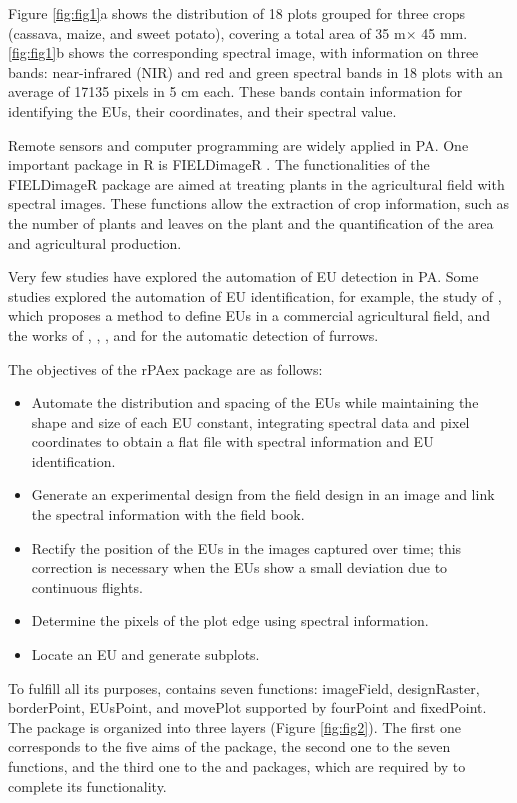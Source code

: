 Figure \ref{fig:fig1}a shows the distribution of 18 plots grouped for three crops (cassava, maize, and sweet potato), covering a total area of 35 m× 45 mm. \ref{fig:fig1}b shows the corresponding spectral image, with information on three bands: near-infrared (NIR) and red and green spectral bands in 18 plots with an average of 17135 pixels in 5 cm each. These bands contain information for identifying the EUs, their coordinates, and their spectral value.

Remote sensors and computer programming are widely applied in PA. One important package in R is FIELDimageR \citep{matias2020fieldimager}. The functionalities of the FIELDimageR package are aimed at treating plants in the agricultural field with spectral images. These functions allow the extraction of crop information, such as the number of plants and leaves on the plant and the quantification of the area and agricultural production.

Very few studies have explored the automation of EU detection in PA. Some studies explored the automation of EU identification, for example, the study of \citet{willers2008defining}, which proposes a method to define EUs in a commercial agricultural field, and the works of \citet{montalvo2012automatic}, \citet{guerrero2013automatic}, \citet{perez2015semi}, \citet{basso2020uav} and \citet{zhang2018automated} for the automatic detection of furrows.

The objectives of the rPAex package are as follows:

\begin{itemize}
\tightlist
\item
  Automate the distribution and spacing of the EUs while maintaining the shape and size of each EU constant, integrating spectral data and pixel coordinates to obtain a flat file with spectral information and EU identification.
\item
  Generate an experimental design from the field design in an image and link the spectral information with the field book.
\item
  Rectify the position of the EUs in the images captured over time; this correction is necessary when the EUs show a small deviation due to continuous flights.
\item
  Determine the pixels of the plot edge using spectral information.
\item
  Locate an EU and generate subplots.
\end{itemize}

To fulfill all its purposes,  contains seven functions: imageField, designRaster, borderPoint, EUsPoint, and movePlot supported by fourPoint and fixedPoint. The package is organized into three layers (Figure \ref{fig:fig2}). The first one corresponds to the five aims of the package, the second one to the seven functions, and the third one to the  and  packages, which are required by  to complete its functionality.

